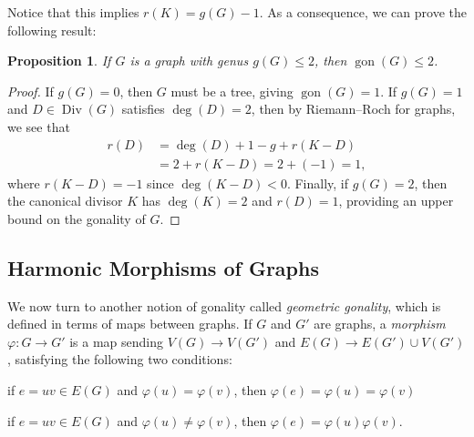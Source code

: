 \documentclass[10pt]{amsart}
\newtheorem{prop}[theorem]{Proposition}
\renewenvironment{enumerate}[1][]{\if\relax\detokenize{#1}\relax\sourceenumerate\else\sourceenumerate[label=#1]\fi}{\endsourceenumerate}
\DeclareMathOperator{\gon}{gon}
\DeclareMathOperator{\Div}{Div}
\begin{document}
Notice that this implies $r(K) = g(G) - 1$. As a consequence, we can prove the following result:

\begin{prop}
\label{prop:genus2}
If $G$ is a graph with genus $g(G) \leq 2$, then $\gon (G) \leq 2$.
\end{prop}

\begin{proof}
If $g(G) = 0$, then $G$ must be a tree, giving $\gon (G) = 1$. If $g(G) = 1$ and $D \in \Div (G)$ satisfies $\deg (D) = 2$, then by Riemann--Roch for graphs, we see that
\begin{align*}
 r(D) &= \deg (D) + 1 - g + r(K - D) \\
 &= 2 + r(K - D) = 2+(-1)=1,
\end{align*}
where $r(K-D)=-1$ since $\deg(K-D)<0$.
Finally, if $g(G) = 2$, then the canonical divisor $K$ has $\deg (K) = 2$ and $r(D) = 1$, providing an upper bound on the gonality of $G$.
\end{proof}

\subsection{Harmonic Morphisms of Graphs}

We now turn to another notion of gonality called \emph{geometric gonality}, which is defined in terms of maps between graphs. If $G$ and $G'$ are graphs, a \emph{morphism} $\varphi : G \to G'$ is a map sending $V(G) \to V(G')$ and $E(G) \to E(G') \cup V(G')$, satisfying the following two conditions:

\begin{enumerate}
 \item\label{Sect2.4_1} if $e = uv \in E(G)$ and $\varphi(u) = \varphi(v)$, then $\varphi(e) = \varphi(u) = \varphi(v)$
 \item\label{Sect2.4_2} if $e = uv \in E(G)$ and $\varphi(u) \neq \varphi(v)$, then $\varphi(e) = \varphi(u)\varphi(v)$.
\end{enumerate}
\end{document}
